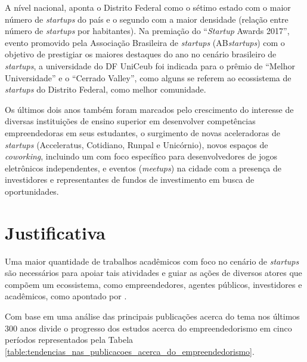 A nível nacional,  aponta o Distrito Federal como o sétimo estado com o maior número de \textit{startups} do país e o segundo com a maior densidade (relação entre número de \textit{startups} por habitantes). Na premiação do ``\textit{Startup} Awards 2017'', evento promovido pela Associação Brasileira de \textit{startups} (AB\textit{startups}) com o objetivo de prestigiar os maiores destaques do ano no cenário brasileiro de \textit{startups}, a universidade do DF UniCeub foi indicada para o prêmio de ``Melhor Universidade'' e o ``Cerrado Valley'', como alguns se referem ao ecossistema de \textit{startups} do Distrito Federal, como melhor comunidade. 

Os últimos dois anos também foram marcados pelo crescimento do interesse de diversas instituições de ensino superior em desenvolver competências empreendedoras em seus estudantes, o surgimento de novas aceleradoras de \textit{startups} (Acceleratus, Cotidiano, Runpal e Unicórnio), novos espaços de \textit{coworking}, incluindo um com foco específico para desenvolvedores de jogos eletrônicos independentes, e eventos (\textit{meetups}) na cidade com a presença de investidores e representantes de fundos de investimento em busca de oportunidades. 

\section{Justificativa}
\label{section:justificativa}

Uma maior quantidade de trabalhos acadêmicos com foco no cenário de \textit{startups} são necessários para apoiar tais atividades e guiar as ações de diversos atores que compõem um ecossistema, como empreendedores, agentes públicos, investidores e acadêmicos, como apontado por .

Com base em uma análise das principais publicações acerca do tema nos últimos 300 anos  divide o progresso dos estudos acerca do empreendedorismo em cinco períodos representados pela Tabela \ref{table:tendencias_nas_publicacoes_acerca_do_empreendedorismo}.

